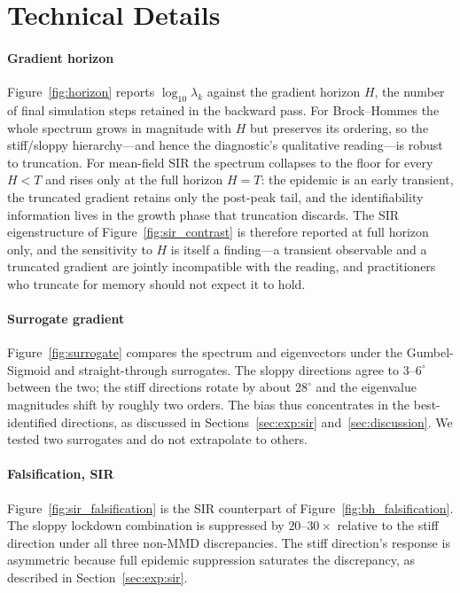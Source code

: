 \documentclass[10pt,twocolumn]{article}
\begin{document}
\section{Technical Details}
\label{app:technical}

\paragraph{Gradient horizon}
Figure~\ref{fig:horizon} reports $\log_{10}\lambda_k$ against the gradient horizon $H$,
the number of final simulation steps retained in the backward pass. For Brock--Hommes
the whole spectrum grows in magnitude with $H$ but preserves its ordering, so the
stiff/sloppy hierarchy---and hence the diagnostic's qualitative reading---is robust to
truncation. For mean-field SIR the spectrum collapses to the floor for every $H < T$
and rises only at the full horizon $H = T$: the epidemic is an early transient, the
truncated gradient retains only the post-peak tail, and the identifiability
information lives in the growth phase that truncation discards. The SIR eigenstructure
of Figure~\ref{fig:sir_contrast} is therefore reported at full horizon only, and the
sensitivity to $H$ is itself a finding---a transient observable and a truncated
gradient are jointly incompatible with the reading, and practitioners who truncate for
memory should not expect it to hold.

\paragraph{Surrogate gradient}
Figure~\ref{fig:surrogate} compares the spectrum and eigenvectors under the
Gumbel-Sigmoid and straight-through surrogates. The sloppy directions agree to
$3$--$6^\circ$ between the two; the stiff directions rotate by about $28^\circ$ and the
eigenvalue magnitudes shift by roughly two orders. The bias thus concentrates in the
best-identified directions, as discussed in Sections~\ref{sec:exp:sir}
and~\ref{sec:discussion}. We tested two surrogates and do not extrapolate to others.

\paragraph{Falsification, SIR}
Figure~\ref{fig:sir_falsification} is the SIR counterpart of
Figure~\ref{fig:bh_falsification}. The sloppy lockdown combination is suppressed by
$20$--$30\times$ relative to the stiff direction under all three non-MMD
discrepancies. The stiff direction's response is asymmetric because full epidemic
suppression saturates the discrepancy, as described in Section~\ref{sec:exp:sir}.
\end{document}
